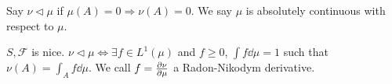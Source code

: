 \begin{definition}
	Say $\nu \triangleleft \mu$ if $\mu(A) = 0 \Rightarrow \nu(A) = 0$. We say $\mu$ is absolutely continuous with respect to $\mu$.
\end{definition}

\begin{theorem}
	$S, \mathcal{F}$ is nice. $\nu  \triangleleft \mu \iff \exists f\in L^1(\mu)$ and $f\geq 0$, $\int f \dd{\mu} = 1$ such that $\nu(A) = \int_A f \dd{\mu}$. We call $f = \pdv{\nu}{\mu} $ a Radon-Nikodym derivative.
\end{theorem}